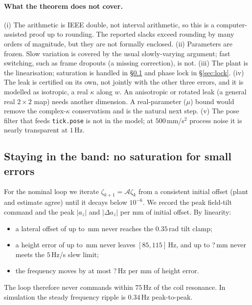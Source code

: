 \documentclass[11pt]{article}
\newcommand{\regionHeightSlewMm}{?}\newcommand{\regionHzPerMm}{?}\newcommand{\lockMargin}{?}%
\begin{document}
\paragraph{What the theorem does not cover.} (i) The arithmetic is IEEE double, not interval
arithmetic, so this is a computer-assisted proof up to rounding. The reported slacks exceed rounding
by many orders of magnitude, but they are not formally enclosed. (ii) Parameters are frozen. Slow
variation is covered by the usual slowly-varying argument; fast switching, such as frame dropouts
(a missing correction), is not. (iii) The plant is the linearisation; saturation is handled in
\S\ref{sec:band} and phase lock in \S\ref{sec:lock}. (iv) The leak is certified on its own, not jointly with
the other three errors, and it is modelled as isotropic, a real $\kappa$ along $w$. An anisotropic or
rotated leak (a general real $2\times2$ map) needs another dimension. A real-parameter ($\mu$) bound
would remove the complex-$\kappa$ conservatism and is the natural next step. (v) The pose filter that feeds \texttt{tick.pose} is not in the model; at $500$\,mm/s$^2$
process noise it is nearly transparent at $1$\,Hz.

\subsection{Staying in the band: no saturation for small errors}
\label{sec:band}
For the nominal loop we iterate $\zeta_{k+1}=\mathcal A\zeta_k$ from a consistent initial offset (plant
and estimate agree) until it decays below $10^{-6}$. We record the peak field-tilt command and the
peak $|a_z|$ and $|\Delta a_z|$ per mm of initial offset. By linearity:
\begin{itemize}[leftmargin=*]
\item a lateral offset of up to \regionLateralMm\,mm never reaches the $0.35$\,rad tilt clamp;
\item a height error of up to \regionHeightBandMm\,mm never leaves $[85,115]$\,Hz, and up to
  \regionHeightSlewMm\,mm never meets the $5$\,Hz/s slew limit;
\item the frequency moves by at most \regionHzPerMm\,Hz per mm of height error.
\end{itemize}
The loop therefore never commands within $75$\,Hz of the coil resonance. In simulation the steady
frequency ripple is $0.34$\,Hz peak-to-peak.
\end{document}
